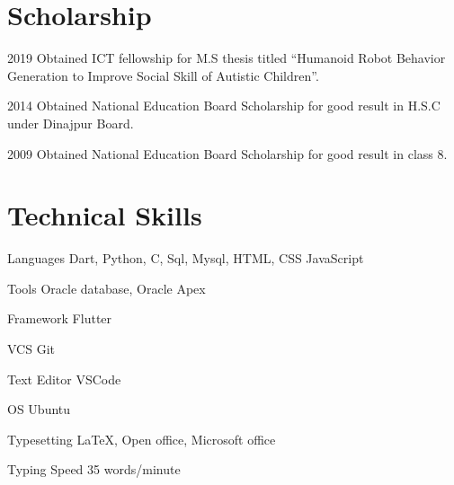\documentclass[a4paper,12pt]{article}
\begin{document}
\section{Scholarship}
\begin{CV}
\item[2019] Obtained ICT fellowship for M.S thesis titled “Humanoid Robot Behavior Generation to Improve Social Skill of Autistic Children”.
\item[2014] Obtained National Education Board Scholarship for good result in H.S.C under Dinajpur Board.
\item[2009] Obtained National Education Board Scholarship for good result in class 8.
\end{CV}

\section{Technical Skills}
\begin{CV}
\item[Languages]  Dart, Python, C, Sql, Mysql, HTML, CSS JavaScript
\item[Tools] Oracle database, Oracle Apex
\item[Framework] Flutter
\item[VCS] Git
\item[Text Editor] VSCode
\item[OS] Ubuntu
\item[Typesetting] \LaTeX{}, Open office, Microsoft office
\item[Typing Speed] 35 words/minute 
\end{CV}
\end{document}
